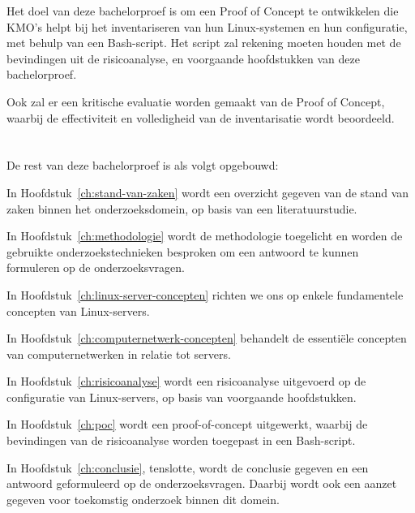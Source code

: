 Het doel van deze bachelorproef is om een Proof of Concept te ontwikkelen die KMO's helpt bij het inventariseren van hun Linux-systemen en hun configuratie, met behulp van een Bash-script.
Het script zal rekening moeten houden met de bevindingen uit de risicoanalyse, en voorgaande hoofdstukken van deze bachelorproef.

Ook zal er een kritische evaluatie worden gemaakt van de Proof of Concept, waarbij de effectiviteit en volledigheid van de inventarisatie wordt beoordeeld.

\section{}%
\label{sec:opzet-bachelorproef}


De rest van deze bachelorproef is als volgt opgebouwd:

In Hoofdstuk~\ref{ch:stand-van-zaken} wordt een overzicht gegeven van de stand van zaken binnen het onderzoeksdomein, op basis van een literatuurstudie.

In Hoofdstuk~\ref{ch:methodologie} wordt de methodologie toegelicht en worden de gebruikte onderzoekstechnieken besproken om een antwoord te kunnen formuleren op de onderzoeksvragen.

In Hoofdstuk~\ref{ch:linux-server-concepten} richten we ons op enkele fundamentele concepten van Linux-servers.

In Hoofdstuk~\ref{ch:computernetwerk-concepten} behandelt de essentiële concepten van computernetwerken in relatie tot servers.

In Hoofdstuk~\ref{ch:risicoanalyse} wordt een risicoanalyse uitgevoerd op de configuratie van Linux-servers, op basis van voorgaande hoofdstukken.

In Hoofdstuk~\ref{ch:poc} wordt een proof-of-concept uitgewerkt, waarbij de bevindingen van de risicoanalyse worden toegepast in een Bash-script.

In Hoofdstuk~\ref{ch:conclusie}, tenslotte, wordt de conclusie gegeven en een antwoord geformuleerd op de onderzoeksvragen. Daarbij wordt ook een aanzet gegeven voor toekomstig onderzoek binnen dit domein.
